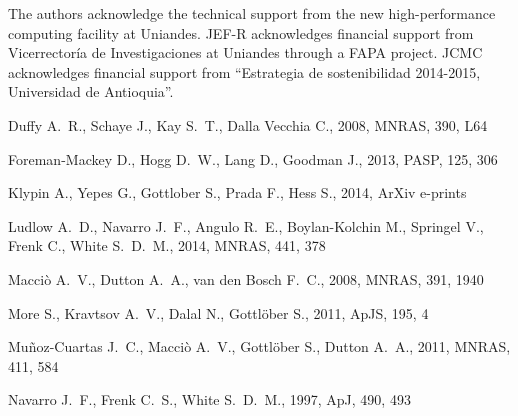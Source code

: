 \documentclass[a4,useAMS,usenatbib,usegraphicx]{mn2e}
\newcommand{\apj}{ApJ}
\newcommand{\apjs}{ApJS}
\newcommand{\mnras}{MNRAS}
\newcommand{\pasp}{PASP}
\begin{document}
\vspace{0.5cm}

 The authors acknowledge the technical support from the new
 high-performance computing facility at Uniandes. JEF-R acknowledges
 financial support from Vicerrector\'ia de Investigaciones at Uniandes
 through a FAPA project. JCMC acknowledges financial support from
 ``Estrategia de  sostenibilidad 2014-2015, Universidad de
 Antioquia''.    


%
\begin{thebibliography}{}

{Duffy} A.~R.,  {Schaye} J.,  {Kay} S.~T.,    {Dalla Vecchia} C.,  2008,
  \mnras, 390, L64

{Foreman-Mackey} D.,  {Hogg} D.~W.,  {Lang} D.,    {Goodman} J.,  2013, \pasp,
  125, 306

{Klypin} A.,  {Yepes} G.,  {Gottlober} S.,  {Prada} F.,    {Hess} S.,  2014,
  ArXiv e-prints

{Ludlow} A.~D.,  {Navarro} J.~F.,  {Angulo} R.~E.,  {Boylan-Kolchin} M.,
  {Springel} V.,  {Frenk} C.,    {White} S.~D.~M.,  2014, \mnras, 441, 378

{Macci{\`o}} A.~V.,  {Dutton} A.~A.,    {van den Bosch} F.~C.,  2008, \mnras,
  391, 1940

{More} S.,  {Kravtsov} A.~V.,  {Dalal} N.,    {Gottl{\"o}ber} S.,  2011, \apjs,
  195, 4

{Mu{\~n}oz-Cuartas} J.~C.,  {Macci{\`o}} A.~V.,  {Gottl{\"o}ber} S.,
  {Dutton} A.~A.,  2011, \mnras, 411, 584

{Navarro} J.~F.,  {Frenk} C.~S.,    {White} S.~D.~M.,  1997, \apj, 490, 493


\end{thebibliography}
\end{document}
